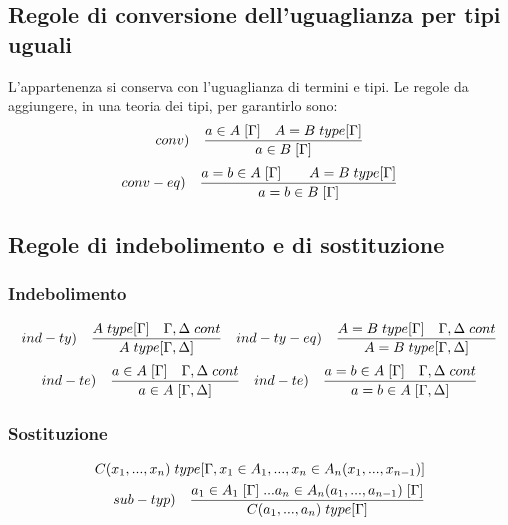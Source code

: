 \documentclass[10pt,a4paper, italian]{book}
\begin{document}
{{{\subsection{Regole di conversione dell'uguaglianza per tipi uguali}
\label{subsec:conversione-uguaglianza}
L'appartenenza si conserva con l'uguaglianza di termini e tipi. Le regole da aggiungere, in una teoria dei tipi, per garantirlo sono:
\[ conv) \quad \frac{a \in A\hspace{0.1cm}[\Gamma] \quad A=B\hspace{0.1cm}type[\Gamma]}{a \in B\hspace{0.1cm}[\Gamma]} \]
\[ conv-eq) \quad \frac{a=b \in A\hspace{0.1cm}[\Gamma] \qquad A=B\hspace{0.1cm}type[\Gamma]}{a=b \in B\hspace{0.1cm}[\Gamma]} \]
\subsection{Regole di indebolimento e di sostituzione}
\label{subsec:indebolimento-sostituzione}
\subsubsection{Indebolimento}
\label{subsec:indebolimento}
\[ ind-ty) \quad \frac{A\hspace{0.1cm}type[\Gamma] \quad \Gamma,\Delta\hspace{0.1cm}cont}{A\hspace{0.1cm}type[\Gamma,\Delta]} \quad ind-ty-eq) \quad \frac{A=B\hspace{0.1cm}type[\Gamma] \quad \Gamma,\Delta\hspace{0.1cm}cont}{A=B\hspace{0.1cm}type[\Gamma,\Delta]} \]
\[ ind-te) \quad \frac{a \in A\hspace{0.1cm}[\Gamma] \quad \Gamma,\Delta\hspace{0.1cm}cont}{a \in A\hspace{0.1cm}[\Gamma,\Delta]} \quad ind-te) \quad \frac{a=b \in A\hspace{0.1cm}
[\Gamma] \quad \Gamma,\Delta\hspace{0.1cm}cont}{a=b \in A\hspace{0.1cm}[\Gamma,\Delta]} \]
\subsubsection{Sostituzione}
\label{subsec:sostituzione}
\begin{equation}
\begin{split}
C(x_1,...,x_n)\hspace{0.1cm}type[\Gamma, x_1 \in A_1,...,x_n \in A_n(x_1,...,x_{n-1})] \\ sub-typ) \quad \frac{a_1 \in A_1\hspace{0.1cm}[\Gamma]\hspace{0.1cm}...a_n \in A_n(a_1,...,a_{n-1})\hspace{0.1cm}[\Gamma]}{ C(a_1,...,a_n)\hspace{0.1cm}type[\Gamma]}
\end{split}
\end{equation}

}}}
\end{document}

